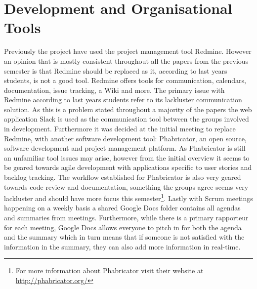 \section{Development and Organisational Tools}
Previously the project have used the project management tool Redmine.
However an opinion that is mostly consistent throughout all the papers from the previous semester is that Redmine should be replaced as it, according to last years students, is not a good tool.
Redmine offers tools for communication, calendars, documentation, issue tracking, a Wiki and more.
The primary issue with Redmine according to last years students refer to its lackluster communication solution.
As this is a problem stated throughout a majority of the papers the web application Slack is used as the communication tool between the groups involved in development.
Furthermore it was decided at the initial meeting to replace Redmine, with another software development tool: Phabricator, an open source, software development and project management platform. 
As Phabricator is still an unfamiliar tool issues may arise, however from the initial overview it seems to be geared towards agile development with applications specific to user stories and backlog tracking.
The workflow established for Phabricator is also very geared towards code review and documentation, something the groups agree seems very lackluster and should have more focus this semester\footnote{For more information about Phabricator visit their website at \url{http://phabricator.org/}}.
Lastly with Scrum meetings happening on a weekly basis a shared Google Docs folder contains all agendas and summaries from meetings.
Furthermore, while there is a primary rapporteur for each meeting, Google Docs allows everyone to pitch in for both the agenda and the summary which in turn means that if someone is not satisfied with the information in the summary, they can also add more information in real-time.


